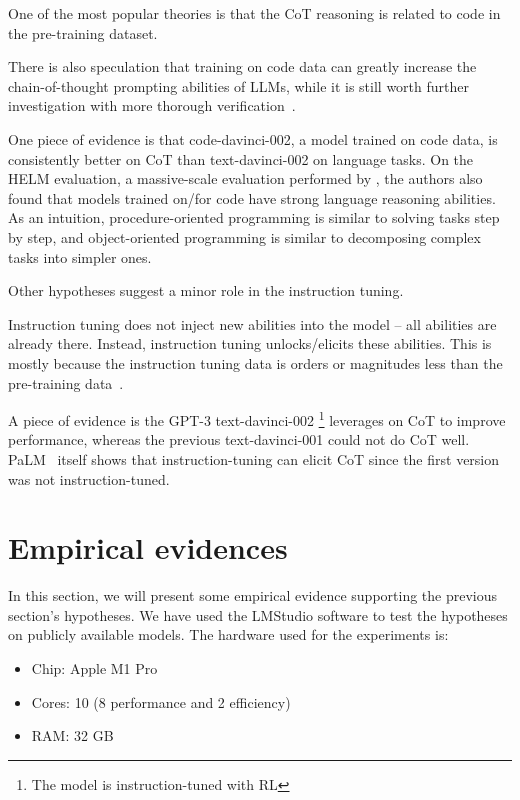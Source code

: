 One of the most popular theories is that the CoT reasoning is related to code in the pre-training dataset.
\begin{displayquote}
	There is also speculation that training on code data can greatly increase the chain-of-thought prompting abilities of LLMs, while it is still worth further investigation with more thorough verification~\cite{survey}.
\end{displayquote}
One piece of evidence is that code-davinci-002, a model trained on code data, is consistently better on CoT than text-davinci-002 on language tasks.
On the HELM evaluation, a massive-scale evaluation performed by \textcite{liang2022holistic}, the authors also found that models trained on/for code have strong language reasoning abilities.
As an intuition, procedure-oriented programming is similar to solving tasks step by step, and object-oriented programming is similar to decomposing complex tasks into simpler ones.

Other hypotheses suggest a minor role in the instruction tuning.
\begin{displayquote}
	Instruction tuning does not inject new abilities into the model -- all abilities are already there.
	Instead, instruction tuning unlocks/elicits these abilities.
	This is mostly because the instruction tuning data is orders or magnitudes less than the pre-training data~\cite{fu2022gptroadmap}.
\end{displayquote}
A piece of evidence is the GPT-3 text-davinci-002 \footnote{The model is instruction-tuned with RL} leverages on CoT to improve performance, whereas the previous text-davinci-001 could not do CoT well.
PaLM~\cite{chowdhery2022palm} itself shows that instruction-tuning can elicit CoT since the first version was not instruction-tuned.

\section{Empirical evidences}
\label{sec:empirical-evidence}

In this section, we will present some empirical evidence supporting the previous section's hypotheses.
We have used the LMStudio\cite{lmstudio} software to test the hypotheses on publicly available models.
The hardware used for the experiments is:
\begin{itemize}
	\item Chip: Apple M1 Pro
	\item Cores: 10 (8 performance and 2 efficiency)
	\item RAM: 32 GB
\end{itemize}

